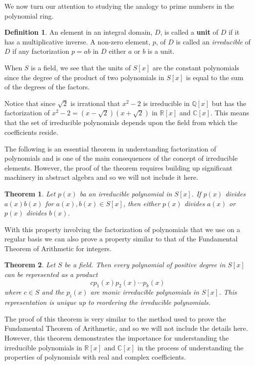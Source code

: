 \documentclass[
]{book}
\newtheorem{theorem}{Theorem}[chapter]
\theoremstyle{definition}
\newtheorem{definition}{Definition}[chapter]
\theoremstyle{definition}
\theoremstyle{definition}
\theoremstyle{definition}
\theoremstyle{remark}
\begin{document}
We now turn our attention to studying the analogy to prime numbers in the polynomial ring.

\begin{definition}
An element in an integral domain, \(D\), is called a \textbf{unit} of \(D\) if it has a multiplicative inverse. A non-zero element, \(p\), of \(D\) is called an \emph{irreducible} of \(D\) if any factorization \(p=ab\) in \(D\) either \(a\) or \(b\) is a unit.
\end{definition}

When \(S\) is a field, we see that the units of \(S[x]\) are the constant polynomials since the degree of the product of two polynomials in \(S[x]\) is equal to the sum of the degrees of the factors.

Notice that since \(\sqrt{2}\) is irrational that \(x^2-2\) is irreducible in \(\mathbb{Q}[x]\) but has the factorization of \(x^2-2=(x-\sqrt{2})(x+\sqrt{2})\) in \(\mathbb{R}[x]\) and \(\mathbb{C}[x]\). This means that the set of irreducible polynomials depends upon the field from which the coefficients reside.

The following is an essential theorem in understanding factorization of polynomials and is one of the main consequences of the concept of irreducible elements. However, the proof of the theorem requires building up significant machinery in abstract algebra and so we will not include it here.

\begin{theorem}
Let \(p(x)\) ba an irreducible polynomial in \(S[x]\). If \(p(x)\) divides \(a(x)b(x)\) for \(a(x),b(x)\in S[x]\), then either \(p(x)\) divides \(a(x)\) or \(p(x)\) divides \(b(x)\).
\end{theorem}

With this property involving the factorization of polynomials that we use on a regular basis we can also prove a property similar to that of the Fundamental Theorem of Arithmetic for integers.

\begin{theorem}
\protect\hypertarget{thm:polynomial-factorization}{}\label{thm:polynomial-factorization}Let \(S\) be a field. Then every polynomial of positive degree in \(S[x]\) can be represented as a product
\[ c p_1(x) p_2(x) \cdots p_k(x)\] where \(c\in S\) and the \(p_i(x)\) are monic irreducible polynomials in \(S[x]\). This representation is unique up to reordering the irreducible polynomials.
\end{theorem}

The proof of this theorem is very similar to the method used to prove the Fundamental Theorem of Arithmetic, and so we will not include the details here. However, this theorem demonstrates the importance for understanding the irreducible polynomials in \(\mathbb{R}[x]\) and \(\mathbb{C}[x]\) in the process of understanding the properties of polynomials with real and complex coefficients.
\end{document}
